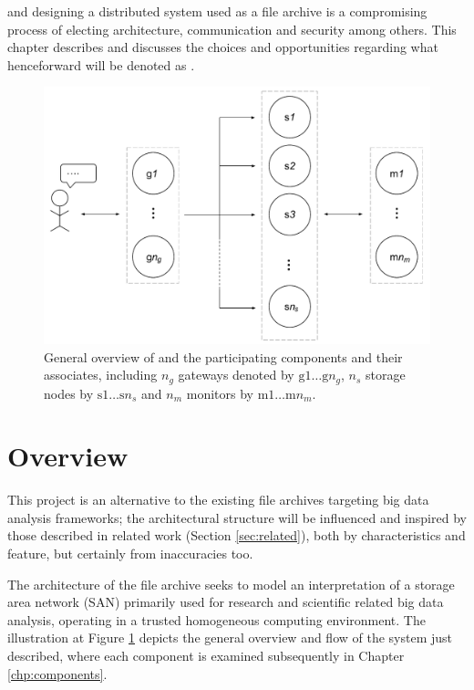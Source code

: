  and designing a distributed system used as a file archive is a compromising process of electing architecture, communication and security among others. This chapter describes and discusses the choices and opportunities regarding what henceforward will be denoted as \CodeNameFull. 

\begin{figure}
	\centering
	\includegraphics[scale=0.60]{pdf/sofa-overview.pdf}
	\caption[General overview of \CodeName]{General overview of \CodeName and the participating components and their associates, including $n_g$ gateways denoted by $\text{g}1 \ldots \text{g}n_g$, $n_s$ storage nodes by $\text{s}1 \ldots \text{s}n_s$ and $n_m$ monitors by $\text{m}1 \ldots \text{m}n_m$. \label{fig:sofa-overview}}
\end{figure}

\section{Overview}
This project is an alternative to the existing file archives targeting big data analysis frameworks; the architectural structure will be influenced and inspired by those described in related work (Section \ref{sec:related}), both by characteristics and feature, but certainly from inaccuracies too. 
\newline

The architecture of the file archive seeks to model an interpretation of a storage area network (SAN) primarily used for research and scientific related big data analysis, operating in a trusted homogeneous computing environment. The illustration at Figure \ref{fig:sofa-overview} depicts the general overview and flow of the system just described, where each component is examined subsequently in Chapter \ref{chp:components}.

